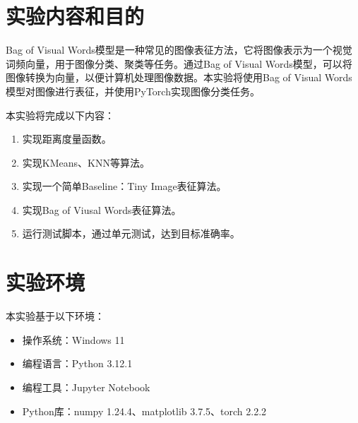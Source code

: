 \section{实验内容和目的}

Bag of Visual Words模型是一种常见的图像表征方法，它将图像表示为一个视觉词频向量，用于图像分类、聚类等任务。通过Bag of Visual Words模型，可以将图像转换为向量，以便计算机处理图像数据。本实验将使用Bag of Visual Words模型对图像进行表征，并使用PyTorch实现图像分类任务。

本实验将完成以下内容：

\begin{enumerate}
    \item 实现距离度量函数。
    \item 实现KMeans、KNN等算法。
    \item 实现一个简单Baseline：Tiny Image表征算法。
    \item 实现Bag of Viusal Words表征算法。
    \item 运行测试脚本，通过单元测试，达到目标准确率。
\end{enumerate}

\section{实验环境}

本实验基于以下环境：

\begin{itemize}
    \item 操作系统：Windows 11
    \item 编程语言：Python 3.12.1
    \item 编程工具：Jupyter Notebook
    \item Python库：numpy 1.24.4、matplotlib 3.7.5、torch 2.2.2
\end{itemize}
